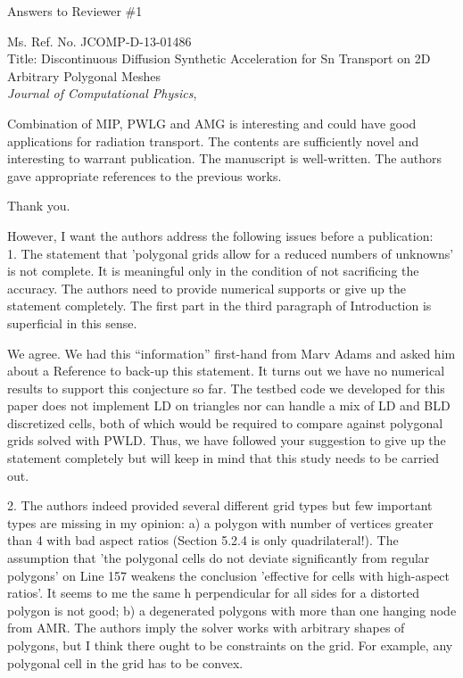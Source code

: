\documentclass{article}
\begin{document}
\begin{center}
{ \Large Answers to Reviewer \#1}
\end{center}

\bigskip

\noindent Ms. Ref. No. JCOMP-D-13-01486\\
Title: Discontinuous Diffusion Synthetic Acceleration for Sn Transport on 2D Arbitrary Polygonal Meshes \\
{\it Journal of Computational Physics},\\

\bigskip
\bigskip

{
\color{blue}
 Combination of MIP, PWLG and AMG is interesting and could have good applications for radiation transport. The contents are sufficiently novel and interesting to warrant publication. The manuscript is well-written. The authors gave appropriate references to the previous works.
}

Thank you.

\bigskip

{
\color{blue}
However, I want the authors address the following issues before a publication:\\

1. The statement that 'polygonal grids allow for a reduced numbers of unknowns' is not complete. It is meaningful only in the condition of not sacrificing the accuracy. The authors need to provide numerical supports or give up the statement completely. The first part in the third paragraph of Introduction is superficial in this sense.
}

We agree. We had this ``information'' first-hand from Marv Adams and asked him about a Reference to back-up this statement. It turns out we have no numerical results to support this conjecture so far. The testbed code we developed for this paper does not implement LD on triangles nor can handle a mix of LD and BLD discretized cells, both of which would be required to compare against polygonal grids solved with PWLD. Thus, we have followed your suggestion to give up the statement completely but will keep in mind that this study needs to be carried out. 

\bigskip


{
\color{blue}
2. The authors indeed provided several different grid types but few important types are missing in my opinion:
a) a polygon with number of vertices greater than 4 with bad aspect ratios (Section 5.2.4 is only quadrilateral!). The assumption that 'the polygonal cells do not deviate significantly from regular polygons' on Line 157 weakens the conclusion 'effective for cells with high-aspect ratios'. It seems to me the same h perpendicular for all sides for a distorted polygon is not good;
b) a degenerated polygons with more than one hanging node from AMR.
The authors imply the solver works with arbitrary shapes of polygons, but I think there ought to be constraints on the grid. For example, any polygonal cell in the grid has to be convex.
}
\end{document}
